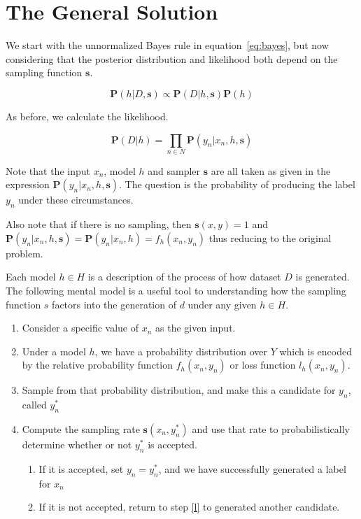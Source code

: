 \documentclass[twoside]{article}
\begin{document}
\section{The General Solution}

We start with the unnormalized Bayes rule in equation~\eqref{eq:bayes}, but now considering that the posterior distribution and likelihood both depend on the sampling function \(\mathbf{s}\).

\[\mathbf{P}(h|D,\mathbf{s})\propto\mathbf{P}(D|h,\mathbf{s})\mathbf{P}(h)\]

As before, we calculate the likelihood.

\[\mathbf{P}(D|h)=\prod_{n \in N} \mathbf{P}(y_n|x_n,h,\mathbf{s})\]

Note that the input \(x_n\), model \(h\) and sampler \(\mathbf{s}\) are all taken as given in the expression \(\mathbf{P}(y_n|x_n,h,\mathbf{s})\). The question is the probability of producing the label \(y_n\) under these circumstances.

Also note that if there is no sampling, then \(\mathbf{s}(x,y)=1\) and \(\mathbf{P}(y_n|x_n,h,\mathbf{s}) = \mathbf{P}(y_n|x_n,h)=f_h(x_n,y_n)\) thus reducing to the original problem.

Each model \(h \in H\) is a description of the process of how dataset \(D\) is generated. The following mental model is a useful tool to understanding how the sampling function \(s\) factors into the generation of \(d\) under any given \(h \in H\).

\begin{enumerate}
	\item Consider a specific value of \(x_n\) as the given input.
	\item Under a model \(h\), we have a probability distribution over \(Y\) which is encoded by the relative probability function \(f_h(x_n,y_n)\) or loss function \(l_h(x_n,y_n)\).
	\item \label{l} Sample from that probability distribution, and make this a candidate for \(y_n\), called \(y_n^*\)
	\item Compute the sampling rate \(\mathbf{s}(x_n,y_n^*)\) and use that rate to probabilistically determine whether or not \(y_n^*\) is accepted.
    \begin{enumerate}
    	  \item If it is accepted, set \(y_n=y_n^*\), and we have successfully generated a label for \(x_n\)
        \item If it is not accepted, return to step \ref{l} to generated another candidate.
    \end{enumerate}
\end{enumerate}
\end{document}
